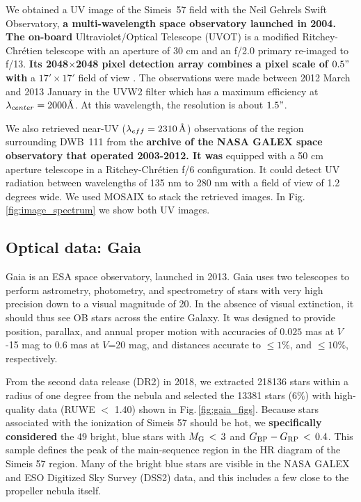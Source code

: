 \documentclass{aa}
\begin{document}
We obtained a UV image of the Simeis~57 field with the Neil Gehrels
Swift Observatory, {\bf a multi-wavelength space observatory launched
  in 2004. The on-board} Ultraviolet/Optical Telescope (UVOT) is a
modified Ritchey-Chr\'etien telescope with an aperture of 30 cm and an
f/2.0 primary re-imaged to f/13. {\bf Its 2048$\times$2048 pixel
  detection array combines a pixel scale of $0.5"$ with} a
  $17'\times17'$ field of view \citep{2008MNRAS.383..627P}. The
  observations were made between 2012 March and 2013 January in the
  UVW2 filter which has a maximum efficiency at
  $\lambda_{center} = 2000\mathrm{\AA}$.  At this wavelength, the
  resolution is about $1.5"$.

\par We also retrieved near-UV
($\lambda_{eff} = 2310 \, \mathrm{\AA}$) observations of the region
surrounding DWB~111 from the {\bf archive of the NASA GALEX space
observatory that operated 2003-2012. It was} equipped with a 50 cm
aperture telescope in a Ritchey-Chr\'etien f/6 configuration. It could
detect UV radiation between wavelengths of 135 nm to 280 nm with a
field of view of 1.2 degrees wide. We used MOSAIX
\citep{armengot2014mosaix} to stack the retrieved images.  In
Fig.\,\ref{fig:image_spectrum} we show both UV images.



\subsection{Optical data: Gaia}

Gaia \citep{refId0} is an ESA space observatory, launched in 2013.
Gaia uses two telescopes to perform astrometry,
photometry, and spectrometry of stars with very high precision down to
a visual magnitude of 20. In the absence of visual extinction, it
should thus see OB stars across the entire Galaxy. It was designed to
provide position, parallax, and annual proper motion with accuracies
of $0.025$ mas at $V$ -15 mag to $0.6$ mas at $V$=20 mag, and
distances accurate to $\leq1\%$, and $\leq10\%$, respectively.

\par From the second data release (DR2) in 2018, we extracted 218136
stars within a radius of one degree from the nebula and selected the
13381 stars ($6\%$) with high-quality data (RUWE $<$ 1.40) shown in
Fig.\,\ref{fig:gaia_figs}. Because stars associated with the
ionization of Simeis 57 should be hot, we {\bf specifically considered}
the 49 bright, blue stars with $M_{\rm G}\,<\,3$ and
$G_{\rm BP}-G_{\rm RP}\,<\,0.4$.  This sample defines the peak of the
main-sequence region in the HR diagram of the Simeis 57 region. Many
of the bright blue stars are visible in the NASA GALEX and ESO
Digitized Sky Survey (DSS2) data, and this includes a few close to the
propeller nebula itself.
\end{document}

